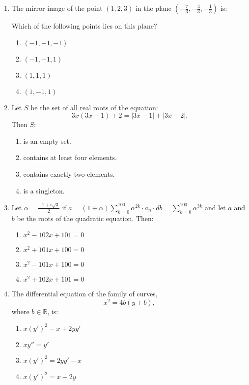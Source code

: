 \documentclass{article}
\begin{document}
\begin{enumerate}
\item The mirror image of the point $(1, 2, 3)$ in the plane $(-\frac{7}{3}, -\frac{4}{3}, -\frac{1}{3})$ is:

Which of the following points lies on this plane?

\begin{enumerate}
    \item $(-1,-1,-1)$
    \item $(-1,-1,1)$
    \item $(1,1,1)$
    \item $(1,-1,1)$
\end{enumerate}

\item Let $S$ be the set of all real roots of the equation:
\[
3x(3x-1)+2=|3x-1|+|3x-2|.
\]
Then $S$:

\begin{enumerate}
    \item is an empty set.
    \item contains at least four elements.
    \item contains exactly two elements.
    \item is a singleton.
\end{enumerate}

\item Let $\alpha = \frac{-1 + i\sqrt{3}}{2}$ if $
a = (1 + \alpha) \sum_{k=0}^{100} \alpha^{2k} \cdot a_n \cdot db = \sum_{k=0}^{100} \alpha^{3k}$
and let $a$ and $b$ be the roots of the quadratic equation. Then:

\begin{enumerate}
    \item $x^2 - 102x + 101 = 0$
    \item $x^2 + 101x + 100 = 0$
    \item $x^2 - 101x + 100 = 0$
    \item $x^2 + 102x + 101 = 0$
\end{enumerate}

\item The differential equation of the family of curves, 
\[
x^2 = 4b(y + b),
\]
where $b \in \mathbb{R}$, is:

\begin{enumerate}
    \item $x (y')^2 - x + 2y y'$
    \item $xy'' = y'$
    \item $x (y')^2 = 2y y' - x$
    \item $x (y')^2 = x - 2y$
\end{enumerate}


\end{enumerate}
\end{document}
